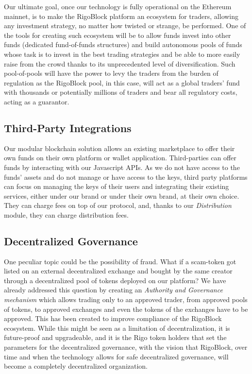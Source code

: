 \documentclass[9pt,oneside]{amsart}
\begin{document}
\begin{multicols}{2}
Our ultimate goal, once our technology is fully operational on the Ethereum mainnet, is to make the RigoBlock platform an ecosystem for traders, allowing any investment strategy, no matter how twisted or strange, be performed. One of the tools for creating such ecosystem will be to allow funds invest into other funds (dedicated fund-of-funds structures) and build autonomous pools of funds whose task is to invest in the best trading strategies and be able to more easily raise from the crowd thanks to its unprecedented level of diversification. Such pool-of-pools will have the power to levy the traders from the burden of regulation as the RigoBlock pool, in this case, will act as a global traders’ fund with thousands or potentially millions of traders and bear all regulatory costs, acting as a guarantor.

\subsection{Third-Party Integrations}
Our modular blockchain solution allows an existing marketplace to offer their own funds on their own platform or wallet application. Third-parties can offer funds by interacting with our Javascript APIs. As we do not have access to the funds' assets and do not manage or have access to the keys, third party platforms can focus on managing the keys of their users and integrating their existing services, either under our brand or under their own brand, at their own choice. They can charge fees on top of our protocol, and, thanks to our \textit{Distribution} module, they can charge distribution fees. 

\subsection{Decentralized Governance}
One peculiar topic could be the possibility of fraud. What if a scam-token got listed on an external decentralized exchange and bought by the same creator through a decentralized pool of tokens deployed on our platform? We have already addressed this question by creating an \textit{Authority and Governance mechanism} which allows trading only to an approved trader, from approved pools of tokens, to approved exchanges and even the tokens of the exchanges have to be approved. This has been created to improve compliance of the RigoBlock ecosystem. While this might be seen as a limitation of decentralization, it is future-proof and upgradeable, and it is the Rigo token holders that set the parameters for the decentralized governance, with the vision that RigoBlock, over time and when the technology allows for safe decentralized governance, will become a completely decentralized organization.


\end{multicols}
\end{document}
